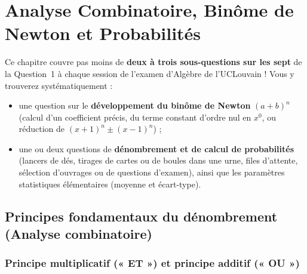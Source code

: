 \chapter{Analyse Combinatoire, Binôme de Newton et Probabilités}

Ce chapitre couvre pas moins de \textbf{deux à trois sous-questions sur les sept} de la Question~1 à chaque session de l'examen d'Algèbre de l'UCLouvain ! Vous y trouverez systématiquement :
\begin{itemize}
    \item une question sur le \textbf{développement du binôme de Newton} $(a + b)^n$ (calcul d'un coefficient précis, du terme constant d'ordre nul en $x^0$, ou réduction de $(x+1)^n \pm (x-1)^n$) ;
    \item une ou deux questions de \textbf{dénombrement et de calcul de probabilités} (lancers de dés, tirages de cartes ou de boules dans une urne, files d'attente, sélection d'ouvrages ou de questions d'examen), ainsi que les paramètres statistiques élémentaires (moyenne et écart-type).
\end{itemize}

\section{Principes fondamentaux du dénombrement (Analyse combinatoire)}

\subsection{Principe multiplicatif (« ET ») et principe additif (« OU »)}

